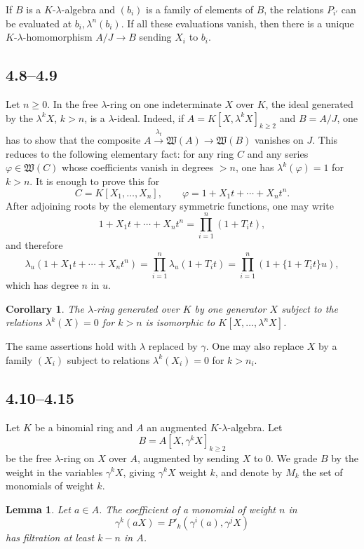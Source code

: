 \documentclass[11pt]{article}
\theoremstyle{plain}
\newtheorem{lemma}[theorem]{Lemma}
\newtheorem{corollary}[theorem]{Corollary}
\theoremstyle{definition}
\theoremstyle{remark}
\begin{document}
If $B$ is a $K$-$\lambda$-algebra and $(b_i)$ is a family of elements of $B$, the relations $P_{i'}$ can be evaluated at $b_i,\lambda^n(b_i)$. If all these evaluations vanish, then there is a unique $K$-$\lambda$-homomorphism $A/J\to B$ sending $X_i$ to $b_i$.

\subsection*{4.8--4.9}
Let $n\geq 0$. In the free $\lambda$-ring on one indeterminate $X$ over $K$, the ideal generated by the $\lambda^kX$, $k>n$, is a $\lambda$-ideal. Indeed, if $A=K[X,\lambda^kX]_{k\geq 2}$ and $B=A/J$, one has to show that the composite $A\xrightarrow{\lambda_t}\mathfrak W(A)\to\mathfrak W(B)$ vanishes on $J$. This reduces to the following elementary fact: for any ring $C$ and any series $\varphi\in\mathfrak W(C)$ whose coefficients vanish in degrees $>n$, one has $\lambda^k(\varphi)=1$ for $k>n$. It is enough to prove this for
\[
C=K[X_1,\ldots,X_n],
\qquad
\varphi=1+X_1t+\cdots+X_nt^n.
\]
After adjoining roots by the elementary symmetric functions, one may write
\[
1+X_1t+\cdots+X_nt^n=\prod_{i=1}^{n}(1+T_it),
\]
and therefore
\[
\lambda_u(1+X_1t+\cdots+X_nt^n)=\prod_{i=1}^{n}\lambda_u(1+T_it)=\prod_{i=1}^{n}(1+\{1+T_it\}u),
\]
which has degree $n$ in $u$.

\begin{corollary}
The $\lambda$-ring generated over $K$ by one generator $X$ subject to the relations $\lambda^k(X)=0$ for $k>n$ is isomorphic to $K[X,\ldots,\lambda^nX]$.
\end{corollary}

The same assertions hold with $\lambda$ replaced by $\gamma$. One may also replace $X$ by a family $(X_i)$ subject to relations $\lambda^k(X_i)=0$ for $k>n_i$.

\subsection*{4.10--4.15}
Let $K$ be a binomial ring and $A$ an augmented $K$-$\lambda$-algebra. Let
\[
B=A[X,\gamma^kX]_{k\geq 2}
\]
be the free $\lambda$-ring on $X$ over $A$, augmented by sending $X$ to $0$. We grade $B$ by the weight in the variables $\gamma^kX$, giving $\gamma^kX$ weight $k$, and denote by $M_k$ the set of monomials of weight $k$.

\begin{lemma}
Let $a\in A$. The coefficient of a monomial of weight $n$ in
\[
\gamma^k(aX)=P'_k(\gamma^i(a),\gamma^jX)
\]
has filtration at least $k-n$ in $A$.
\end{lemma}
\end{document}
